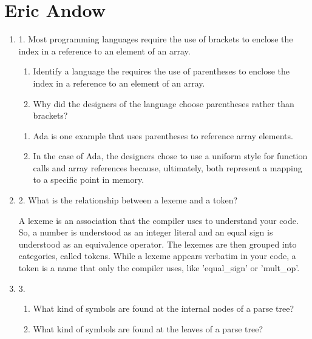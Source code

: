 
\chapter{Eric Andow}

\begin{enumerate}
  \item 1. Most programming languages require the use of brackets to
    enclose the index in a reference to an element of an array.
  \begin{enumerate}
    \item Identify a language the requires the use of parentheses
      to enclose the index in a reference to an element of an array.
    \item Why did the designers of the language choose parentheses
      rather than brackets?
    \end{enumerate}

  \begin{answer}

  \begin{enumerate}
    \item Ada is one example that uses parentheses to reference array elements.
    \item In the case of Ada, the designers chose to use a uniform
      style for function calls and array references because,
      ultimately, both represent a mapping to a specific point in
      memory.
    \end{enumerate}

    \end{answer}
    
  \item 2. What is the relationship between a lexeme and a token?

  \begin{answer}

    A lexeme is an association that the compiler uses to understand
    your code. So, a number is understood as an integer literal and an
    equal sign is understood as an equivalence operator. The lexemes
    are then grouped into categories, called tokens. While a lexeme
    appears verbatim in your code, a token is a name that only the
    compiler uses, like 'equal\_sign' or 'mult\_op'.

    \end{answer}

  \item 3.
  \begin{enumerate}
    \item What kind of symbols are found at the internal nodes of a
      parse tree?
    \item What kind of symbols are found at the leaves of a parse tree?
    \end{enumerate}


\end{enumerate}

